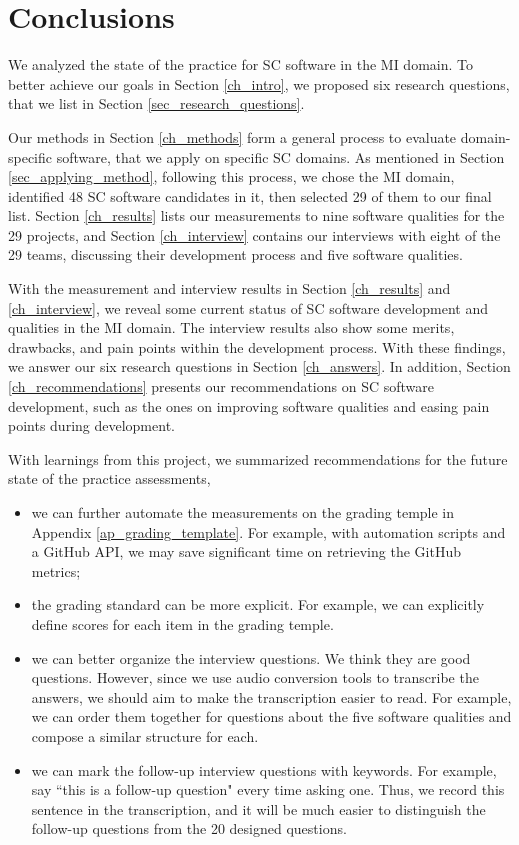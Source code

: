 \chapter{Conclusions}
\label{ch_conclusions}

We analyzed the state of the practice for SC software in the MI domain. To better achieve our goals in Section \ref{ch_intro}, we proposed six research questions, that we list in Section \ref{sec_research_questions}.

Our methods in Section \ref{ch_methods} form a general process to evaluate domain-specific software, that we apply on specific SC domains. As mentioned in Section \ref{sec_applying_method}, following this process, we chose the MI domain, identified 48 SC software candidates in it, then selected 29 of them to our final list. Section \ref{ch_results} lists our measurements to nine software qualities for the 29 projects, and Section \ref{ch_interview} contains our interviews with eight of the 29 teams, discussing their development process and five software qualities.

With the measurement and interview results in Section \ref{ch_results} and \ref{ch_interview}, we reveal some current status of SC software development and qualities in the MI domain. The interview results also show some merits, drawbacks, and pain points within the development process. With these findings, we answer our six research questions in Section \ref{ch_answers}. In addition, Section \ref{ch_recommendations} presents our recommendations on SC software development, such as the ones on improving software qualities and easing pain points during development.

With learnings from this project, we summarized recommendations for the future state of the practice assessments,
\begin{itemize}
	\item we can further automate the measurements on the grading temple in Appendix \ref{ap_grading_template}. For example, with automation scripts and a GitHub API, we may save significant time on retrieving the GitHub metrics;
	\item the grading standard can be more explicit. For example, we can explicitly define scores for each item in the grading temple.
	\item we can better organize the interview questions. We think they are good questions. However, since we use audio conversion tools to transcribe the answers, we should aim to make the transcription easier to read. For example, we can order them together for questions about the five software qualities and compose a similar structure for each.
	\item we can mark the follow-up interview questions with keywords. For example, say ``this is a follow-up question" every time asking one. Thus, we record this sentence in the transcription, and it will be much easier to distinguish the follow-up questions from the 20 designed questions.
\end{itemize}

